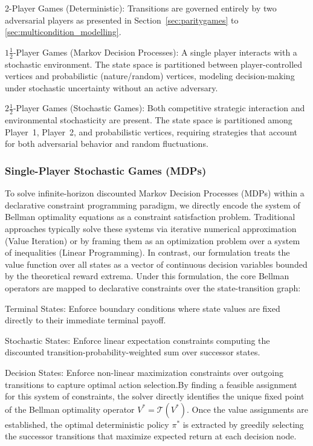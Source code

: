 \documentclass{article}
\begin{document}
2-Player Games (Deterministic): Transitions are governed entirely by two adversarial players as presented in Section~\ref{sec:paritygames} to \ref{sec:multicondition_modelling}.

$1\frac{1}{2}$-Player Games (Markov Decision Processes): A single player interacts with a stochastic environment. The state space is partitioned between player-controlled vertices and probabilistic (nature/random) vertices, modeling decision-making under stochastic uncertainty without an active adversary.

$2\frac{1}{2}$-Player Games (Stochastic Games): Both competitive strategic interaction and environmental stochasticity are present. The state space is partitioned among Player~1, Player~2, and probabilistic vertices, requiring strategies that account for both adversarial behavior and random fluctuations.

\subsubsection{Single-Player Stochastic Games (MDPs)}

To solve infinite-horizon discounted Markov Decision Processes (MDPs) \cite{Puterman:1994Markov} within a declarative constraint programming paradigm, we directly encode the system of Bellman optimality equations \cite{Bellman:1957:dynamic} as a constraint satisfaction problem. Traditional approaches typically solve these systems via iterative numerical approximation (Value Iteration) or by framing them as an optimization problem over a system of inequalities (Linear Programming). In contrast, our formulation treats the value function over all states as a vector of continuous decision variables bounded by the theoretical reward extrema. Under this formulation, the core Bellman operators are mapped to declarative constraints over the state-transition graph:

Terminal States: Enforce boundary conditions where state values are fixed directly to their immediate terminal payoff.

Stochastic States: Enforce linear expectation constraints computing the discounted transition-probability-weighted sum over successor states.

Decision States: Enforce non-linear maximization constraints over outgoing transitions to capture optimal action selection.By finding a feasible assignment for this system of constraints, the solver directly identifies the unique fixed point of the Bellman optimality operator $V^* = \mathcal{T}(V^*)$. Once the value assignments are established, the optimal deterministic policy $\pi^*$ is extracted by greedily selecting the successor transitions that maximize expected return at each decision node.
\end{document}
